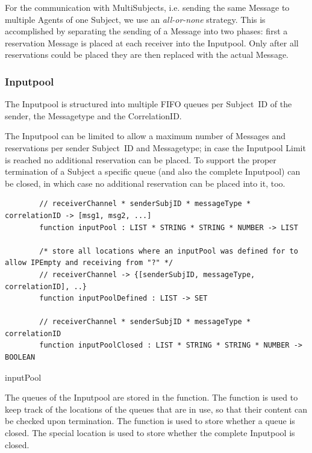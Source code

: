 For the communication with MultiSubjects, i.e. sending the same Message to
multiple Agents of one Subject, we use an \textit{all-or-none} strategy. This
is accomplished by separating the sending of a Message into two phases: first
a reservation Message is placed at each receiver into the Inputpool.
Only after all reservations could be placed they are then replaced with the
actual Message.

\subsubsection{Inputpool}\label{sec:Inputpool}

The Inputpool is structured into multiple FIFO queues per Subject~ID of the sender, the Messagetype and the CorrelationID.

The Inputpool can be limited to allow a maximum number of Messages and
reservations per sender Subject~ID and Messagetype; in case the Inputpool Limit is
reached no additional reservation can be placed. To support the proper
termination of a Subject a specific queue (and also the complete Inputpool)
can be closed, in which case no additional reservation can be placed into it,
too.

\begin{listing}[H]
	\begin{verbatim}
		// receiverChannel * senderSubjID * messageType * correlationID -> [msg1, msg2, ...]
		function inputPool : LIST * STRING * STRING * NUMBER -> LIST
		
		/* store all locations where an inputPool was defined for to allow IPEmpty and receiving from "?" */
		// receiverChannel -> {[senderSubjID, messageType, correlationID], ..}
		function inputPoolDefined : LIST -> SET
		
		// receiverChannel * senderSubjID * messageType * correlationID
		function inputPoolClosed : LIST * STRING * STRING * NUMBER -> BOOLEAN
	\end{verbatim}
	\caption{inputPool}
	\label{lst:shortasm:inputPool}
\end{listing}


The queues of the Inputpool are stored in the  function.
The function  is used to keep track of the
locations of the queues that are in use, so that their content can be checked
upon termination. The function  is used to store
whether a queue is closed. The special location
 is used to
store whether the complete Inputpool is closed.

